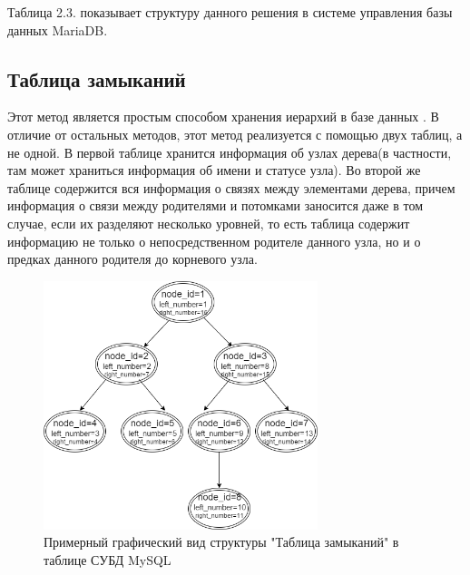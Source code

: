 \documentclass[a4paper,14pt]{extreport}
\theoremstyle{definition}
\begin{document}
Таблица 2.3. показывает структуру данного решения в системе управления базы данных MariaDB.
\begin{table}[H]
\end{table}
\subsection{Таблица замыканий}
Этот метод является простым способом хранения иерархий в базе данных \cite{Tarasov,Evseeva}. В отличие от остальных методов, этот метод реализуется с помощью двух таблиц, а не одной. В первой таблице хранится информация об узлах дерева(в частности, там может храниться информация об имени и статусе узла). Во второй же таблице содержится вся информация о связях между элементами дерева, причем информация о связи между родителями и потомками заносится даже в том случае, если их разделяют несколько уровней, то есть таблица содержит информацию не только о непосредственном родителе данного узла, но и о предках данного родителя до корневого узла.
\begin{figure}[h!]
\begin{center}
\includegraphics[width=8cm]{13.png}
\caption{Примерный графический вид структуры "Таблица замыканий" в таблице СУБД MySQL}
\label{fig:3}
\end{center}
\end{figure}
\end{document}
